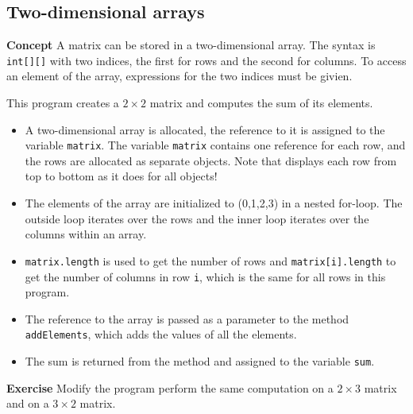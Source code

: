 \subsection{Two-dimensional arrays}\label{array.06}

\textbf{Concept} A matrix can be stored in a two-dimensional array. The syntax is 
\texttt{int[][]} with two indices, the first for rows and the second for 
columns. To access an element of the array, expressions for the two 
indices must be givien.


This program creates a $2 \times 2$ matrix and computes 
the sum of its elements.
\begin{itemize}
  \item A two-dimensional array is allocated, the reference to it is 
  assigned to the variable \texttt{matrix}.
  The variable \texttt{matrix} contains one reference for each row,
  and the rows are allocated as separate objects.
  Note that \jel{} displays each row from top to bottom as it does for all objects!
  \item The elements of the array are initialized to (0,1,2,3) in a nested for-loop.
  The outside loop iterates over the rows and the inner loop iterates over the
  columns within an array.
  \item \texttt{matrix.length} is used to get the number of rows and 
  \texttt{matrix[i].length} to get the number of columns in row \texttt{i}, which 
  is the same for all rows in this program.
  \item The reference to the array is passed as a parameter to the method 
  \texttt{addElements}, which adds the values of all the elements.
  \item The sum is returned from the method and assigned to the variable \texttt{sum}.
\end{itemize}

\textbf{Exercise} Modify the program perform the same computation on a $2 \times 3$
matrix and on a $3 \times 2$ matrix.

